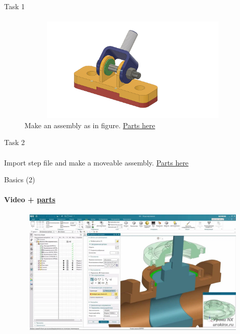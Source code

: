 \documentclass[aspectratio=169]{beamer}
\newcommand{\fbckg}[1]{\usebackgroundtemplate{\texttt{[image: \#1]}}}%
\begin{document}
\begin{frame}[t]{Task 1}
\framesubtitle{}
    \begin{figure}[H]
        \centering\includegraphics[height=5cm,width=1\textwidth,keepaspectratio]{task1.png}
        \caption*{Make an assembly as in figure. \href{https://disk.yandex.ru/d/NqrsuThQWfLtTw}{Parts here}}
        \label{fig:task1.png}
    \end{figure}
\end{frame}

\begin{frame}[t]{Task 2}
    \framesubtitle{}
        Import step file and make a moveable assembly. \href{https://disk.yandex.ru/d/QSK7jE9c5TBQYQ}{Parts here}
    \end{frame}

    \begin{frame}[t]{Basics (2)}
        \framesubtitle{Video + \href{https://disk.yandex.ru/d/-7gSdfC_At05uA}{parts}}
        \vspace{-0.6cm}
        \begin{figure}[H]
            \href{https://disk.yandex.ru/i/kbz5Hqkpsvte8w}{
                \centering\includegraphics[height=6cm,width=1\textwidth,keepaspectratio]{2.png}}
            \label{fig:2}
        \end{figure}
    \end{frame}

\fbckg{fibeamer/figs/last_page.png}
\frame[plain]{}
\end{document}

